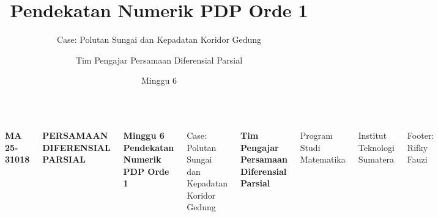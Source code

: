 \documentclass[aspectratio=169,10pt]{beamer}
\title{Pendekatan Numerik PDP Orde 1}
\subtitle{Case: Polutan Sungai dan Kepadatan Koridor Gedung}
\author{Tim Pengajar Persamaan Diferensial Parsial}
\institute{Program Studi Matematika - Institut Teknologi Sumatera}
\date{Minggu 6}
\begin{document}
\begin{frame}[plain]
  \vspace{0.7cm}
  \begin{columns}[T]
      \color{white}
      {\bfseries MA 25-31018}\par\vspace{0.25cm}
      {\Large\bfseries PERSAMAAN\\ DIFERENSIAL\\ PARSIAL}\par\vspace{1.0cm}
      {\color{pdpMint}\large\bfseries Minggu 6}
      {\Huge\bfseries Pendekatan Numerik PDP Orde 1}\par
      \pdporangeline
      {\Large Case: Polutan Sungai dan Kepadatan Koridor Gedung}\par\vspace{0.75cm}
      {\bfseries Tim Pengajar Persamaan Diferensial Parsial}\par\vspace{1.0cm}
      Program Studi Matematika\par
      Institut Teknologi Sumatera\par\vfill
      {\scriptsize Footer: Rifky Fauzi}
  \end{columns}
\end{frame}
\end{document}

